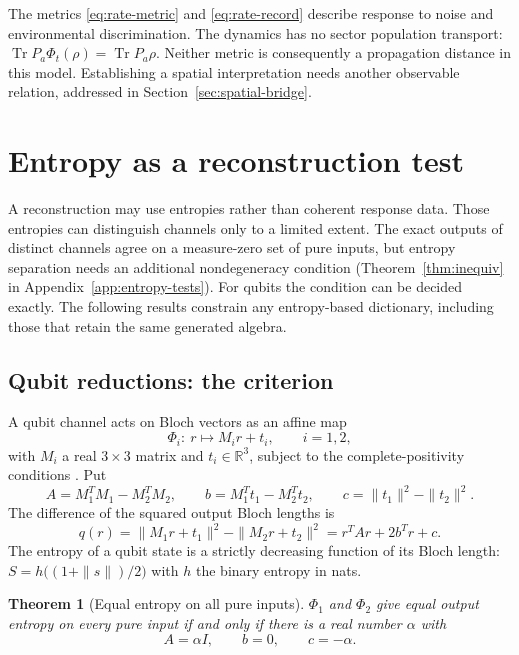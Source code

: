 \documentclass[12pt,a4paper]{article}
\newtheorem{theorem}{Theorem}[section]
\begin{document}
The metrics \eqref{eq:rate-metric} and \eqref{eq:rate-record}
describe response to noise and environmental discrimination.
The dynamics has no sector population transport:
$\operatorname{Tr}P_a\Phi_t(\rho)=\operatorname{Tr}P_a\rho$.
Neither metric is consequently a propagation distance in this
model. Establishing a spatial interpretation needs another
observable relation, addressed in Section~\ref{sec:spatial-bridge}.

\section{Entropy as a reconstruction test}
\label{sec:entropy}

A reconstruction may use entropies rather than coherent response
data. Those entropies can distinguish channels only to a limited
extent. The exact outputs of distinct channels agree on a measure-zero
set of pure inputs, but entropy separation needs an additional nondegeneracy
condition (Theorem~\ref{thm:inequiv} in
Appendix~\ref{app:entropy-tests}). For qubits the condition can be
decided exactly. The following results constrain any entropy-based
dictionary, including those that retain the same generated algebra.

\subsection{Qubit reductions: the criterion}

A qubit channel acts on Bloch vectors as an affine map
\[
\Phi_i:\ r\mapsto M_ir+t_i,\qquad i=1,2,
\]
with $M_i$ a real $3\times3$ matrix and $t_i\in\mathbb R^3$, subject to the complete-positivity conditions \cite{RuskaiSzarekWerner2002}. Put
\[
A=M_1^TM_1-M_2^TM_2,\qquad b=M_1^Tt_1-M_2^Tt_2,\qquad
c=\|t_1\|^2-\|t_2\|^2 .
\]
The difference of the squared output Bloch lengths is
\begin{equation}
q(r)=\|M_1r+t_1\|^2-\|M_2r+t_2\|^2=r^TAr+2b^Tr+c .
\label{eq:q}
\end{equation}
The entropy of a qubit state is a strictly decreasing function of its Bloch length: $S=h\bigl((1+\|s\|)/2\bigr)$ with $h$ the binary entropy in nats.

\begin{theorem}[Equal entropy on all pure inputs]
\label{thm:criterion}
$\Phi_1$ and $\Phi_2$ give equal output entropy on every pure input if and only if there is a real number $\alpha$ with
\begin{equation}
A=\alpha I,\qquad b=0,\qquad c=-\alpha .
\label{eq:criterion}
\end{equation}
\end{theorem}
\end{document}
